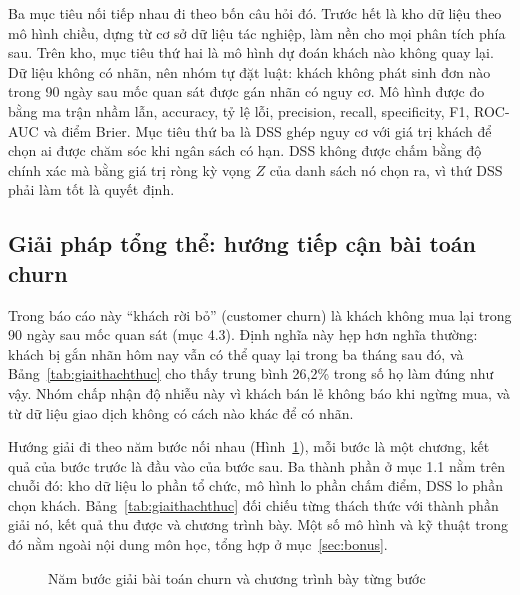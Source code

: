 Ba mục tiêu nối tiếp nhau đi theo bốn câu hỏi đó. Trước hết là kho dữ liệu theo mô hình chiều, dựng từ cơ sở dữ liệu tác nghiệp, làm nền cho mọi phân tích phía sau. Trên kho, mục tiêu thứ hai là mô hình dự đoán khách nào không quay lại. Dữ liệu không có nhãn, nên nhóm tự đặt luật: khách không phát sinh đơn nào trong 90 ngày sau mốc quan sát được gán nhãn có nguy cơ. Mô hình được đo bằng ma trận nhầm lẫn, accuracy, tỷ lệ lỗi, precision, recall, specificity, F1, ROC-AUC và điểm Brier. Mục tiêu thứ ba là DSS ghép nguy cơ với giá trị khách để chọn ai được chăm sóc khi ngân sách có hạn. DSS không được chấm bằng độ chính xác mà bằng giá trị ròng kỳ vọng $Z$ của danh sách nó chọn ra, vì thứ DSS phải làm tốt là quyết định.

\subsection{Giải pháp tổng thể: hướng tiếp cận bài toán churn}
Trong báo cáo này ``khách rời bỏ'' (customer churn) là khách không mua lại trong 90 ngày sau mốc quan sát (mục 4.3). Định nghĩa này hẹp hơn nghĩa thường: khách bị gắn nhãn hôm nay vẫn có thể quay lại trong ba tháng sau đó, và Bảng~\ref{tab:giaithachthuc} cho thấy trung bình 26,2\% trong số họ làm đúng như vậy. Nhóm chấp nhận độ nhiễu này vì khách bán lẻ không báo khi ngừng mua, và từ dữ liệu giao dịch không có cách nào khác để có nhãn.

Hướng giải đi theo năm bước nối nhau (Hình~\ref{fig:huongtiepcan}), mỗi bước là một chương, kết quả của bước trước là đầu vào của bước sau. Ba thành phần ở mục 1.1 nằm trên chuỗi đó: kho dữ liệu lo phần tổ chức, mô hình lo phần chấm điểm, DSS lo phần chọn khách. Bảng~\ref{tab:giaithachthuc} đối chiếu từng thách thức với thành phần giải nó, kết quả thu được và chương trình bày. Một số mô hình và kỹ thuật trong đó nằm ngoài nội dung môn học, tổng hợp ở mục~\ref{sec:bonus}.

\begin{figure}[!htbp]
\centering

\caption{Năm bước giải bài toán churn và chương trình bày từng bước}
\label{fig:huongtiepcan}
\end{figure}


